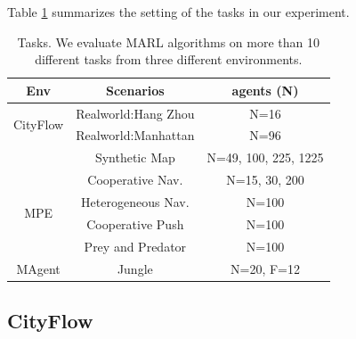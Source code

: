 \documentclass[11pt,a4paper]{article}
\theoremstyle{definition}
\begin{document}



Table \ref{tb:setting} summarizes the setting of the tasks in our experiment.
\begin{table}[ht!]
	
	\begin{center}
		\caption{\small Tasks. We evaluate MARL algorithms on more than 10 different tasks from three different environments.}
		\label{tb:setting}
		
		\small
		\setlength{\tabcolsep}{2pt}
		\begin{tabular}{c | c| c  }
			\hline
			Env & Scenarios & \text{\#}agents (N)\\
			\hline
			\multirow{2}{*}{CityFlow} 
			& Realworld:Hang Zhou & N=16 \\
			& Realworld:Manhattan & N=96 \\
			& Synthetic Map & N=49, 100, 225, 1225 \\
			\hline   
			\multirow{4}{*}{MPE} 
			& Cooperative Nav. & N=15, 30, 200 \\
			& Heterogeneous Nav. & N=100 \\
			& Cooperative Push  & N=100   \\
			& Prey and Predator  & N=100 \\
			\hline   
			MAgent & Jungle & N=20, F=12  \\
			\hline
			
		\end{tabular}
	\end{center}
	\vspace{-3mm}
\end{table}



\subsection{CityFlow}

\end{document}
